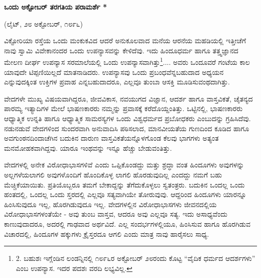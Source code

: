 \begin{center}
\textbf{ಒಂದು ಅಕ್ಟೋಬರ್ ತರಗತಿಯ ಪರಾಮರ್ಶೆ *}
\end{center}

\begin{center}
(ಲೈಟ್, ೨೮ ಅಕ್ಟೋಬರ್, ೧೮೯೬)
\end{center}

ವಿಕ್ಟೋರಿಯಾ ರಸ್ತೆಯ ಒಂದು ಮಂಕುಕವಿದ ಆದರೆ ಅನುಕೂಲವಾದ ಮನೆಯ ಆರನೆಯ ಮಹಡಿಯಲ್ಲಿ ಇತ್ತೀಚೆಗೆ ನಾವು ಸ್ವಾಮಿ ವಿವೇಕಾನಂದರ ಒಂದು ಉಪನ್ಯಾಸವನ್ನು ಕೇಳಿದೆವು. ಇದು ಹಿಂದೂಧರ್ಮ ಹಾಗೂ ತತ್ತ್ವಜ್ಞಾನದ ಮೇಲಣ ದೀರ್ಘ ಉಪನ್ಯಾಸ ಸರಮಾಲೆಯಲ್ಲಿ ಒಂದು ಉಪನ್ಯಾಸವಾಗಿತ್ತು\footnote{2. ಬಹುಶಃ ಇಗ್ಲೆಂಡಿನ ಲಂಡನ್ನಿನಲ್ಲಿ ೧೮೯೬ರ ಅಕ್ಟೋಬರ್ ೨೮ರಂದು ಕೊಟ್ಟ “ವೈದಿಕ ಧರ್ಮದ ಆದರ್ಶಗಳು” ಎಂಬ ಉಪನ್ಯಾಸ. ಇದರ ಪದಶಃ ವರದಿ ಲಭ್ಯವಿಲ್ಲ.}.... ಅವರು ಒಂದೂವರೆ ಗಂಟೆಯ ಕಾಲ ಯಾವುದೇ ಟಿಪ್ಪಣಿಯಿಲ್ಲದೆ ಮಾತನಾಡಿದರು. ಉಪನ್ಯಾಸವು ಒಂದು ಪ್ರಬಂಧವೆನ್ನಬಹುದಾದ ಅಧ್ಯಯನ ಎನ್ನುವುದಕ್ಕಿಂತ ಉಕ್ತಿಗಳ ಪ್ರವಾಹ ಎನ್ನಬಹುದಾದರೂ, ಎಲ್ಲವೂ ತುಂಬಾ ಆಸಕ್ತಿ ಮೂಡಿಸುವಂಥದಾಗಿತ್ತು.

ವೇದಗಳೇ ಮುಖ್ಯ ವಿಷಯವಾಗಿದ್ದರೂ, ಜೀವವಿಕಾಸ, ನವಯುಗದ ವಿಜ್ಞಾನ, ಆದರ್ಶ ಹಾಗೂ ವಾಸ್ತವಿಕತೆ, ಚೈತನ್ಯದ ಪಾರಮ್ಯ ಇತ್ಯಾದಿಗಳ ಮೇಲೆ ಭಾಷಣಕಾರರು ನಮ್ಮನ್ನು ಪ್ರವಾಸಕ್ಕೆ ಕರೆದೊಯ್ದಂತಿತ್ತು. ಒಟ್ಟಿನಲ್ಲಿ, ಭಾಷಣಕಾರರು ಆಧ್ಯಾತ್ಮಿಕ ಉನ್ನತಿ ಹಾಗೂ ಆಧ್ಯಾತ್ಮಿಕ ಸಾಮರಸ್ಯಗಳ ಒಂದು ವಿಶ್ವಧರ್ಮದ ಪ್ರಬೋಧಕರು ಎಂಬುದನ್ನು ಗ್ರಹಿಸಿದೆವು. ನಡುನಡುವೆ ವೇದಗಳಿಂದ ಸುಂದರವಾಗಿ ಅನುವಾದಿಸಿ ಪಠಿಸಲಾದ, ಮಾನವೀಯತೆಯ ಗುಣದಿಂದ ಕೂಡಿದ ಹಾಗೂ ಅವಗುಂಠನದಿಂದಾಚೆಗಿನ ಬದುಕಿನ ದಾರುಣ ವಾಸ್ತವಿಕತೆಯನ್ನೊಳಗೊಂಡ ಕೆಲವು ಭಾಗಗಳು ಅತ್ಯಂತ ಮನಮೋಹಕವಾಗಿದ್ದವು. ಯಾರೂ ಇಂಥವನ್ನು ಇನ್ನೂ ಹೆಚ್ಚು ಬೇಡುವಂತಿತ್ತು.

ವೇದಗಳಲ್ಲಿ ಅನೇಕ ವಿರೋಧಾಭಾಸಗಳಿವೆ ಎಂದು ಒಪ್ಪಿಕೊಂಡದ್ದು ಮತ್ತು ಶ್ರದ್ಧಾ ವಂತ ಹಿಂದೂಗಳು ಅವುಗಳನ್ನು ಅಲ್ಲಗಳೆಯಲಾಗಲಿ ಅವುಗಳೊಂದಿಗೆ ಹೊಂದಿಕೊಳ್ಳ ಲಾಗಲಿ ಹೊರಡುವುದಿಲ್ಲ ಎಂದದ್ದು ನಮಗೆ ಬಹು ಮೆಚ್ಚಿಕೆಯಾಯಿತು. ಪ್ರತಿಯೊಬ್ಬರೂ ತಮಗೆ ಬೇಕಾದ್ದನ್ನು ತೆಗೆದುಕೊಳ್ಳಲು ಸ್ವತಂತ್ರರು. ಬದುಕಿನ ಒಂದಲ್ಲ ಒಂದು ಹಂತದಲ್ಲಿ, ಒಂದಲ್ಲ ಒಂದು ಸ್ತರದಲ್ಲಿ ಎಲ್ಲವೂ ಸತ್ಯವಾಗಿಯೇ ತೋರುವುವು. ಆದ್ದರಿಂದ ಹಿಂದೂಗಳು ಯಾರನ್ನೂ ಹಿಂಸಿಸುವುದೂ ಇಲ್ಲ, ಹೊರಗಿಡುವುದೂ ಇಲ್ಲ. ವೇದಗಳಲ್ಲಿನ ವಿರೋಧಾಭಾಸಗಳು ಜೀವನದಲ್ಲಿಯ ವಿರೋಧಾಭಾಸಗಳಂತೆಯೇ - ಅವು ತುಂಬ ವಾಸ್ತವ, ಆದರೂ ಅವು ಎಲ್ಲವೂ ಸತ್ಯ. ಇದು ಅಸಾಧ್ಯವೆಂದು ಕಾಣುವುದಾದರೂ, ಅದರಲ್ಲಿ ಗಾಢವಾದ ಅರ್ಥವಿದೆ. ಎಲ್ಲ ಸಂದರ್ಭಗಳಲ್ಲಿಯೂ, ಹಿಂಸಿಸುವ ಹಾಗೂ ಹೊರಗಿಡುವ ವಿಚಾರದಲ್ಲಿ, ಹಿಂದೂಗಳ ಹಕ್ಕುಗಳು ಕ್ರೈಸ್ತರದೂ ಆಗಲಿ ಎಂದು ಮಾತ್ರ ನಾವು ಹಾರೈಸಲು ಸಾಧ್ಯ.

